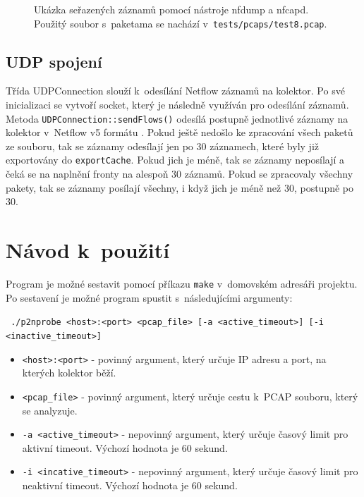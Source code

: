 \documentclass[a4paper, 11pt]{article}
\begin{document}
\begin{sloppypar}
\begin{figure}[!ht]
    \begin{center}
        \caption{Ukázka seřazených záznamů pomocí nástroje nfdump a nfcapd. Použitý soubor s~paketama se nachází v~\texttt{tests/pcaps/test8.pcap}.}
        \label{fig2}
    \end{center}
\end{figure}


\subsection{UDP spojení}
Třída UDPConnection slouží k~odesílání Netflow záznamů na kolektor. Po své inicializaci se vytvoří socket, který je následně využíván pro odesílání záznamů. Metoda \texttt{UDPConnection::sendFlows()} odesílá postupně jednotlivé záznamy na kolektor v~Netflow v5 formátu \cite{netflow5}. Pokud ještě nedošlo ke zpracování všech paketů ze souboru, tak se záznamy odesílají jen po 30 záznamech, které byly již exportovány do \verb|exportCache|. Pokud jich je méně, tak se záznamy neposílají a čeká se na naplnění fronty na alespoň 30 záznamů. Pokud se zpracovaly všechny pakety, tak se záznamy posílají všechny, i když jich je méně než 30, postupně po 30.

\section{Návod k~použití}

Program je možné sestavit pomocí příkazu \texttt{make} v~domovském adresáři projektu. Po sestavení je možné program spustit s~následujícími argumenty:

\vspace{0.1cm}
\texttt{
    ./p2nprobe <host>:<port> <pcap\_file> [-a <active\_timeout>] 
            [-i <inactive\_timeout>]
}

\begin{itemize}
    \item \texttt{<host>:<port>} - povinný argument, který určuje IP adresu a port, na kterých kolektor běží.
    \item \texttt{<pcap\_file>} - povinný argument, který určuje cestu k~PCAP souboru, který se analyzuje.
    \item \texttt{-a <active\_timeout>} - nepovinný argument, který určuje časový limit pro aktivní timeout. Výchozí hodnota je 60 sekund.
    \item \texttt{-i <incative\_timeout>} - nepovinný argument, který určuje časový limit pro neaktivní timeout. Výchozí hodnota je 60 sekund.
\end{itemize}


\end{sloppypar}
\end{document}

